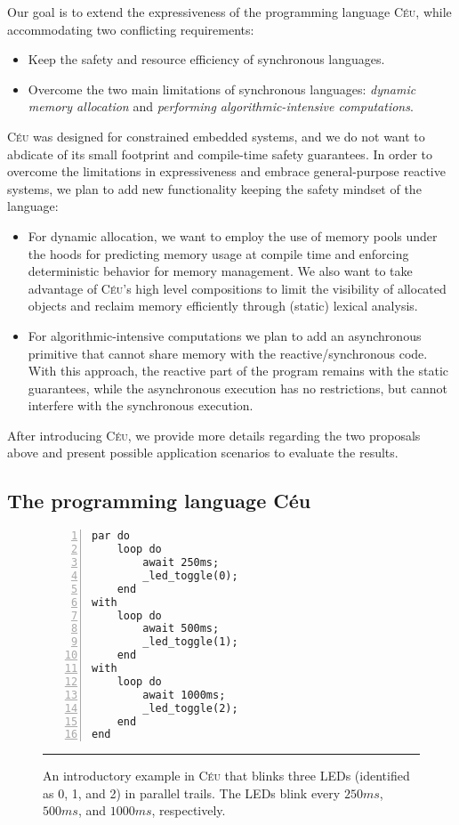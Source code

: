\documentclass[pdftex,12pt,a4paper]{article}
\newcommand{\CEU}{\textsc{C\'{e}u}\xspace}
\begin{document}
Our goal is to extend the expressiveness of the programming language \CEU, 
while accommodating two conflicting requirements:

\begin{itemize}
    \item Keep the safety and resource efficiency of synchronous languages.
    \item Overcome the two main limitations of synchronous languages:
            \emph{dynamic memory allocation}
            and
            \emph{performing algorithmic-intensive computations}.
\end{itemize}

\CEU was designed for constrained embedded systems, and we do not want to 
abdicate of its small footprint and compile-time safety guarantees.
%
In order to overcome the limitations in expressiveness and embrace 
general-purpose reactive systems, we plan to add new functionality keeping the 
safety mindset of the language:

\begin{itemize}
    \item For dynamic allocation, we want to employ the use of memory pools 
    under the hoods for predicting memory usage at compile time and enforcing
    deterministic behavior for memory management.
    We also want to take advantage of \CEU's high level compositions to limit 
    the visibility of allocated objects and reclaim memory efficiently through 
(static) lexical analysis.
    \item For algorithmic-intensive computations we plan to add an asynchronous 
primitive that cannot share memory with the reactive/synchronous code.
    With this approach, the reactive part of the program remains with the 
static guarantees, while the asynchronous execution has no restrictions, but 
cannot interfere with the synchronous execution.
\end{itemize}

After introducing \CEU, we provide more details regarding the two proposals 
above and present possible application scenarios to evaluate the results.

\subsection{The programming language C\'eu}

\begin{figure}[t]
\begin{lstlisting}[numbers=left,xleftmargin=3em]
par do
    loop do
        await 250ms;
        _led_toggle(0);
    end
with
    loop do
        await 500ms;
        _led_toggle(1);
    end
with
    loop do
        await 1000ms;
        _led_toggle(2);
    end
end
\end{lstlisting}
\rule{13.8cm}{0.37pt}
\caption{
    An introductory example in \CEU that blinks three LEDs (identified as 0, 1, 
    and 2) in parallel trails.
    The LEDs blink every $250ms$, $500ms$, and $1000ms$, respectively.
    \label{lst.blink}
}
\end{figure}
\end{document}
